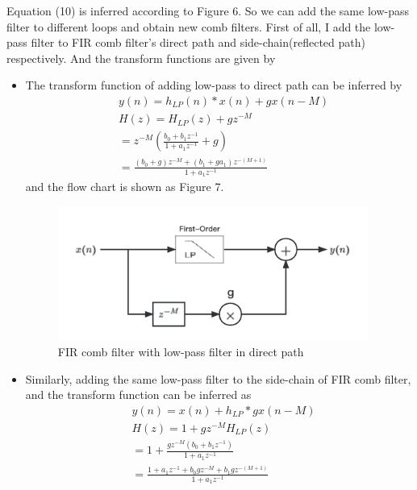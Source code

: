 \documentclass[a4paper]{tufte-handout} %
\begin{document}
Equation (10) is inferred according to Figure 6. So we can add the same low-pass filter to different loops and obtain new comb filters. First of all, I add the low-pass filter to FIR comb filter's direct path and side-chain(reflected path) respectively. 
And the transform functions are given by
\begin{itemize}
    \item The transform function of adding low-pass to direct path can be inferred by
    \begin{equation}
    \begin{aligned}
        &y(n)=h_{LP}(n) \ast x(n) + gx(n-M) \\
        &H(z)=H_{LP}(z)+gz^{-M} \\
        &=z^{-M}(\frac{b_0+b_1z^{-1}}{1+a_1z^{-1}}+g) \\
        &=\frac{(b_0+g)z^{-M}+(b_1+ga_1)z^{-(M+1)}}{1+a_1z^{-1}}
    \end{aligned}
    \end{equation}
    and the flow chart is shown as Figure 7.
    
    \begin{figure}[h]
    \centering
	\includegraphics[width=4in]{Image/DirectPath.png}
	\caption{FIR comb filter with low-pass filter in direct path}
	\label{fig:textfig}
    \end{figure}
    
    \item Similarly, adding the same low-pass filter to the side-chain of FIR comb filter, and the transform function can be inferred as
    \begin{equation}
    \begin{aligned}
        &y(n)=x(n) + h_{LP} \ast gx(n-M) \\
        &H(z)=1+gz^{-M}H_{LP}(z) \\
        &=1+\frac{gz^{-M}(b_0+b_1z^{-1})}{1+a_1z^{-1}} \\
        &=\frac{1+a_1z^{-1}+b_0gz^{-M}+b_1gz^{-(M+1)}}{1+a_1z^{-1}}
    \end{aligned}
    \end{equation}
    

\end{itemize}
\end{document}

